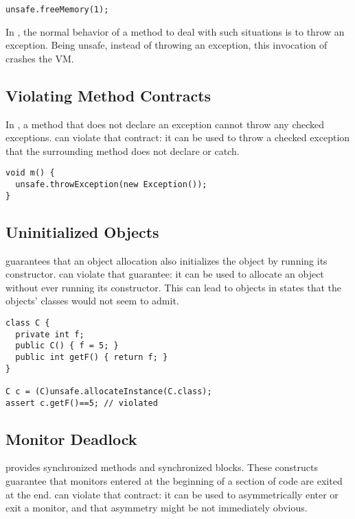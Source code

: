 \begin{lstlisting}[style=java,caption=\smu{} can crash the VM]
unsafe.freeMemory(1);
\end{lstlisting}

In \java{}, the normal behavior of a method to deal with such situations
is to throw an exception.
Being unsafe, instead of throwing an exception,
this invocation of  crashes the VM.

\subsection{Violating Method Contracts}

In \java{}, a method that does not declare an exception cannot throw any
checked exceptions.
\unsafe{} can violate that contract:
it can be used to throw a checked exception that the surrounding method
does not declare or catch.

\begin{lstlisting}[style=java,caption=\smu{} can violate a method contract]
void m() {
  unsafe.throwException(new Exception());
}
\end{lstlisting}

\subsection{Uninitialized Objects}

\java{} guarantees that an object allocation also initializes the object
by running its constructor.
\unsafe{} can violate that guarantee:
it can be used to allocate an object without ever running its
constructor.
This can lead to objects in states that the objects' classes would
not seem to admit.

\begin{lstlisting}[style=java,caption=\smu{} can lead to uninitialized objects]
class C {
  private int f;
  public C() { f = 5; }
  public int getF() { return f; }
}

C c = (C)unsafe.allocateInstance(C.class);
assert c.getF()==5; // violated
\end{lstlisting}

\subsection{Monitor Deadlock}

\java{} provides synchronized methods and synchronized blocks.
These constructs guarantee that monitors entered at the beginning
of a section of code are exited at the end.
\unsafe{} can violate that contract:
it can be used to asymmetrically enter or exit a monitor,
and that asymmetry might be not immediately obvious.

